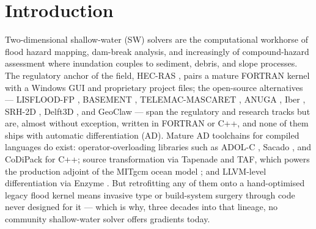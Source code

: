 \section{Introduction}

Two-dimensional shallow-water (SW) solvers are the computational
workhorse of flood hazard mapping, dam-break analysis, and increasingly
of compound-hazard assessment where inundation couples to sediment,
debris, and slope processes. The regulatory anchor of the field, HEC-RAS
\citep{Brunner2020}, pairs a mature FORTRAN kernel with a Windows GUI
and proprietary project files; the open-source alternatives ---
LISFLOOD-FP \citep{Bates2010, BatesDeRoo2000}, BASEMENT
\citep{Vetsch2020}, TELEMAC-MASCARET \citep{Hervouet2007}, ANUGA
\citep{Roberts2015}, Iber \citep{Blade2014}, SRH-2D \citep{Lai2010},
Delft3D \citep{Lesser2004}, and GeoClaw \citep{LeVeque2011} --- span the
regulatory and research tracks but are, almost without exception,
written in FORTRAN or C++, and none of them ships with automatic
differentiation (AD). Mature AD toolchains for compiled languages do
exist: operator-overloading libraries such as ADOL-C
\citep{Griewank1996ADOLC}, Sacado \citep{PhippsPawlowski2012Sacado}, and
CoDiPack \citep{Sagebaum2019CoDiPack} for C++; source transformation via
Tapenade \citep{HascoetPascual2013Tapenade} and TAF, which powers the
production adjoint of the MITgcm ocean model
\citep{Heimbach2005MITgcmAdjoint}; and LLVM-level differentiation via
Enzyme \citep{MosesChuravy2020Enzyme}. But retrofitting any of them onto
a hand-optimised legacy flood kernel means invasive type or build-system
surgery through code never designed for it --- which is why, three
decades into that lineage, no community shallow-water solver offers
gradients today.

